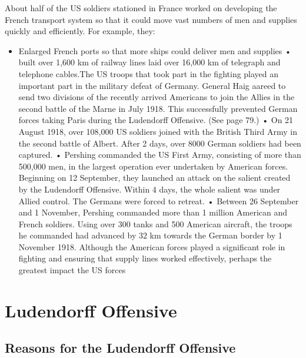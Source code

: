 \documentclass[a4paper,numbers=endperiod,most,twoside,english,final,openany]{scrbook} %
\begin{document}
About half of the US soldiers stationed in France worked on developing the French transport system so that it could move vast numbers of men and supplies quickly and efficiently. For example, they:

\begin{itemize}
	\item Enlarged French ports so that more ships could deliver men and supplies • built over 1,600 km of railway lines laid over 16,000 km of telegraph and telephone cables.The US troops that took part in the fighting played an important part in the military defeat of Germany.
General Haig aareed to send two divisions of the recently arrived Americans to join the Allies in the second battle of the Marne in July 1918. This successfully prevented German forces taking Paris during the Ludendorff Offensive. (See page 79.)
• On 21 August 1918, over 108,000 US soldiers joined with the British
Third Army in the second battle of Albert. After 2 days, over 8000 German
soldiers had been captured.
• Pershing commanded the US First Army, consisting of more than 500,000
men, in the largest operation ever undertaken by American forces. Beginning on 12 September, they launched an attack on the salient created
by the Ludendorff Offensive. Within 4 days, the whole salient was under
Allied control. The Germans were forced to retreat.
• Between 26 September and 1 November, Pershing commanded more
than 1 million American and French soldiers. Using over 300 tanks and 500 American aircraft, the troops he commanded had advanced by 32 km towards the German border by 1 November 1918.
Although the American forces played a significant role in fighting and ensuring that supply lines worked effectively, perhaps the greatest impact the US forces
\end{itemize}

\chapter{Ludendorff Offensive}

\section{Reasons for the Ludendorff Offensive}
\end{document}
